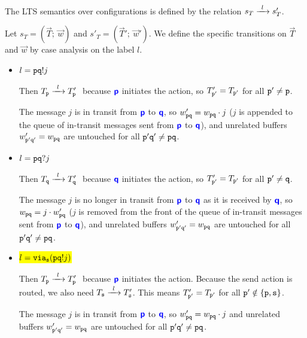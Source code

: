 \begin{definition}
The LTS semantics over configurations is defined by
the relation $\treduce{s_T}{s'_T}{l}$.

Let $s_T = (\vec T; ~ \vec w)$ and $s'_T = (\vec T'; ~ \vec w')$.
We define the specific transitions on $\vec T$ and $\vec w$
by case analysis on the label $l$.

\begin{itemize}

\item $l = {\mathtt{p}}{\mathtt{q}}!{j}$

Then $\treduce{T_\mrole{p}}{T'_\mrole{p}}{l}~$ 
because ${\color{blue}\bm{\mathsf{p}}}$
initiates the action, so
$T'_{\mathtt{p'}} = T_{{\mathtt{p'}}}$ 
for all ${\mathtt{p'}} \neq {\mathtt{p}}$.

The message $j$ is in transit from ${\color{blue}\bm{\mathsf{p}}}$ to ${\color{blue}\bm{\mathsf{q}}}$, 
so $w'_{{{\mathtt{p}}{\mathtt{q}}}} = w_{{{\mathtt{p}}{\mathtt{q}}}} \cdot j$
($j$ is appended to the queue of in-transit messages
sent from ${\color{blue}\bm{\mathsf{p}}}$ to ${\color{blue}\bm{\mathsf{q}}}$),
and unrelated buffers $w'_{{{\mathtt{p'}}{\mathtt{q'}}}} = w_{{{\mathtt{p}}{\mathtt{q}}}}$ 
are untouched for all ${{\mathtt{p'}}{\mathtt{q'}}} \neq { {\mathtt{p}}  {\mathtt{q}} }$.

\item $l = {\mathtt{p}}{\mathtt{q}}?{j}$

Then $\treduce{T_\mrole{q}}{T'_\mrole{q}}{l}~$ 
because ${\color{blue}\bm{\mathsf{q}}}$
initiates the action, so
$T'_{\mathtt{p'}} = T_{{\mathtt{p'}}}$ 
for all ${\mathtt{p'}} \neq {\mathtt{q}}$.

The message $j$ is no longer in transit
from ${\color{blue}\bm{\mathsf{p}}}$ to ${\color{blue}\bm{\mathsf{q}}}$ as it is received by ${\color{blue}\bm{\mathsf{q}}}$,
so $w_{{{\mathtt{p}}{\mathtt{q}}}} = j \cdot w'_{{{\mathtt{p}}{\mathtt{q}}}}$ 
($j$ is removed from the front of the queue of in-transit
messages sent from ${\color{blue}\bm{\mathsf{p}}}$ to ${\color{blue}\bm{\mathsf{q}}}$),
and unrelated buffers $w'_{{{\mathtt{p'}}{\mathtt{q'}}}} = w_{{{\mathtt{p}}{\mathtt{q}}}}$ 
are untouched for all ${{\mathtt{p'}}{\mathtt{q'}}} \neq { {\mathtt{p}}  {\mathtt{q}} }$.

\item \hl{$l = {\texttt{via}_{{\mathtt{s}}}({{\mathtt{p}}{\mathtt{q}}!{j}})}$}

Then $\treduce{T_\mrole{p}}{T'_\mrole{p}}{l}~$ 
because ${\color{blue}\bm{\mathsf{p}}}$
initiates the action.
Because the send action is routed, we also need 
$\treduce{T_\mrole{s}}{T'_\mrole{s}}{l}$.
This means
$T'_{\mathtt{p'}} = T_{{\mathtt{p'}}}$ 
for all ${\mathtt{p'}} \notin \{{\mathtt{p}} , {\mathtt{s}} \}$.

The message $j$ is in transit from ${\color{blue}\bm{\mathsf{p}}}$ to ${\color{blue}\bm{\mathsf{q}}}$, 
so $w'_{{{\mathtt{p}}{\mathtt{q}}}} = w_{{{\mathtt{p}}{\mathtt{q}}}} \cdot j$
and unrelated buffers $w'_{{{\mathtt{p'}}{\mathtt{q'}}}} = w_{{{\mathtt{p}}{\mathtt{q}}}}$ 
are untouched for all ${{\mathtt{p'}}{\mathtt{q'}}} \neq { {\mathtt{p}}  {\mathtt{q}} }$.


\end{itemize}
\end{definition}

